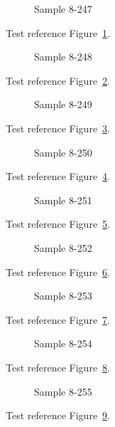 \begin{figure}[tbhp]
\caption{Sample 8-247}
\label{fig:sample-8-247}
\end{figure}

Test reference Figure~\ref{fig:sample-8-247}.

\begin{figure}[tbhp]
\caption{Sample 8-248}
\label{fig:sample-8-248}
\end{figure}

Test reference Figure~\ref{fig:sample-8-248}.

\begin{figure}[tbhp]
\caption{Sample 8-249}
\label{fig:sample-8-249}
\end{figure}

Test reference Figure~\ref{fig:sample-8-249}.

\begin{figure}[tbhp]
\caption{Sample 8-250}
\label{fig:sample-8-250}
\end{figure}

Test reference Figure~\ref{fig:sample-8-250}.

\begin{figure}[tbhp]
\caption{Sample 8-251}
\label{fig:sample-8-251}
\end{figure}

Test reference Figure~\ref{fig:sample-8-251}.

\begin{figure}[tbhp]
\caption{Sample 8-252}
\label{fig:sample-8-252}
\end{figure}

Test reference Figure~\ref{fig:sample-8-252}.

\begin{figure}[tbhp]
\caption{Sample 8-253}
\label{fig:sample-8-253}
\end{figure}

Test reference Figure~\ref{fig:sample-8-253}.

\begin{figure}[tbhp]
\caption{Sample 8-254}
\label{fig:sample-8-254}
\end{figure}

Test reference Figure~\ref{fig:sample-8-254}.

\begin{figure}[tbhp]
\caption{Sample 8-255}
\label{fig:sample-8-255}
\end{figure}

Test reference Figure~\ref{fig:sample-8-255}.

